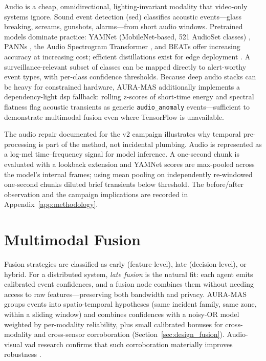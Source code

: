 Audio is a cheap, omnidirectional, lighting-invariant modality that video-only systems ignore. Sound event detection (\gls{sed}) classifies acoustic events---glass breaking, screams, gunshots, alarms---from short audio windows. Pretrained models dominate practice: YAMNet (MobileNet-based, 521 AudioSet classes) \cite{tensorflow_yamnet, hershey2017cnn}, PANNs \cite{kong2019panns}, the Audio Spectrogram Transformer \cite{li2023ast}, and BEATs \cite{chen2022beats} offer increasing accuracy at increasing cost; efficient distillations exist for edge deployment \cite{schmid2024improving, saradopoulos2025real}. A surveillance-relevant subset of classes can be mapped directly to alert-worthy event types, with per-class confidence thresholds. Because deep audio stacks can be heavy for constrained hardware, AURA-MAS additionally implements a dependency-light \gls{dsp} fallback: rolling z-scores of short-time energy and spectral flatness flag acoustic transients as generic \texttt{audio\_anomaly} events---sufficient to demonstrate multimodal fusion even where TensorFlow is unavailable.

The audio repair documented for the v2 campaign illustrates why temporal
pre-processing is part of the method, not incidental plumbing. Audio is
represented as a log-mel time--frequency signal for model inference. A
one-second chunk is evaluated with a lookback extension and YAMNet scores are
max-pooled across the model's internal frames; using mean pooling on
independently re-windowed one-second chunks diluted brief transients below
threshold. The before/after observation and the campaign implications are
recorded in Appendix~\ref{app:methodology}.

\section{Multimodal Fusion}

Fusion strategies are classified as early (feature-level), late (decision-level), or hybrid. For a distributed system, \emph{late fusion} is the natural fit: each agent emits calibrated event confidences, and a fusion node combines them without needing access to raw features---preserving both bandwidth and privacy. AURA-MAS groups events into spatio-temporal hypotheses (same incident family, same zone, within a sliding window) and combines confidences with a noisy-OR model weighted by per-modality reliability, plus small calibrated bonuses for cross-modality and cross-sensor corroboration (Section~\ref{sec:design_fusion}). Audio-visual \gls{vad} research confirms that such corroboration materially improves robustness \cite{wu2025avadclip, ustun2026multimodal}.

